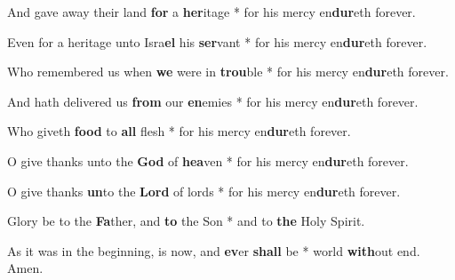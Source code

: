 \begin{multicols}{2}
	And gave away their land \textbf{for} a \textbf{her}itage * for his mercy en\textbf{dur}eth forever.
	
	Even for a heritage unto Isra\textbf{el} his \textbf{ser}vant * for his mercy en\textbf{dur}eth forever.
	
	Who remembered us when \textbf{we} were in \textbf{trou}ble * for his mercy en\textbf{dur}eth forever.
	
	And hath delivered us \textbf{from} our \textbf{en}emies * for his mercy en\textbf{dur}eth forever.
	
	Who giveth \textbf{food} to \textbf{all} flesh * for his mercy en\textbf{dur}eth forever.
	
	O give thanks unto the \textbf{God} of \textbf{hea}ven * for his mercy en\textbf{dur}eth forever.
	
	O give thanks \textbf{un}to the \textbf{Lord} of lords * for his mercy en\textbf{dur}eth forever.
	
	Glory be to the \textbf{Fa}ther, and \textbf{to} the Son * and to \textbf{the} Holy Spirit.
	
	As it was in the beginning, is now, and \textbf{ev}er \textbf{shall} be * world \textbf{with}out end. Amen.
\end{multicols}
